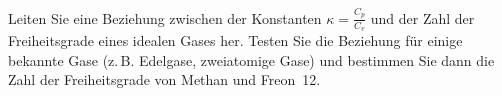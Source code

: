 Leiten Sie eine Beziehung zwischen der Konstanten $\kappa = \frac{C_p}{C_v}$ und der Zahl der Freiheitsgrade eines idealen Gases her. Testen Sie die Beziehung für einige bekannte Gase (z.\,B. Edelgase, zweiatomige Gase) und bestimmen Sie dann die Zahl der Freiheitsgrade von Methan und Freon~12.
